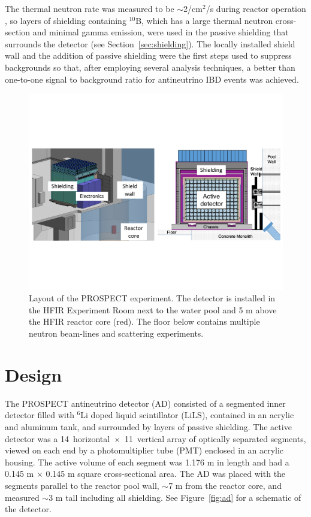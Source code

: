 The thermal neutron rate was measured to be $\sim$2/cm$^2$/s during reactor operation \cite{Ashenfelter:2015tpm}, so layers of shielding containing $^{10}$B, which has a large thermal neutron cross-section and minimal gamma emission, were used in the passive shielding that surrounds the detector (see Section~\ref{sec:shielding}). 
The locally installed shield wall and the addition of passive shielding were the first steps used to suppress backgrounds so that, after employing several analysis techniques, a better than one-to-one signal to background ratio for antineutrino IBD events was achieved. 

\begin{figure}[t]
	\centering
	\includegraphics[width=0.5\linewidth]{tex/4-prospect-images/Shielding}
	\caption{Layout of the PROSPECT experiment. The detector is installed in the HFIR Experiment Room next to the water pool and 5 m above the HFIR reactor core (red). The floor below contains multiple neutron beam-lines and scattering experiments.}
	\label{fig:shielding}
\end{figure}

\section{Design}

The PROSPECT antineutrino detector (AD) consisted of a segmented inner detector filled with $^6$Li doped liquid scintillator (LiLS), contained in an acrylic and aluminum tank, and surrounded by layers of passive shielding. 
The active detector was a 14~horizontal~$\times$~11~vertical array of optically separated segments, viewed on each end by a photomultiplier tube (PMT) enclosed in an acrylic housing. 
The active volume of each segment was 1.176 m in length and had a 0.145 m $\times$ 0.145 m square cross-sectional area.
The AD was placed with the segments parallel to the reactor pool wall, $\sim$7 m from the reactor core, and measured $\sim$3 m tall including all shielding. 
See Figure~\ref{fig:ad} for a schematic of the detector. 

